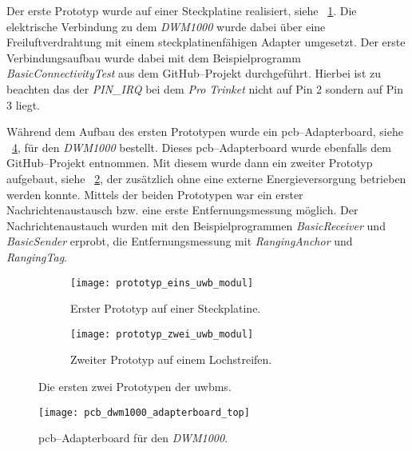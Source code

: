 Der erste Prototyp wurde auf einer Steckplatine realisiert, siehe \figurename~\ref{fig:prototyp_eins_uwb_modul}. Die elektrische Verbindung zu dem \textit{DWM1000} wurde dabei über eine Freiluftverdrahtung mit einem steckplatinenfähigen Adapter umgesetzt. Der erste Verbindungsaufbau wurde dabei mit dem Beispielprogramm \textit{BasicConnectivityTest} aus dem GitHub--Projekt \cite{Trojer2015} durchgeführt. Hierbei ist zu beachten das der \textit{PIN\_IRQ} bei dem \textit{Pro Trinket} nicht auf Pin 2 sondern auf Pin 3 liegt.

Während dem Aufbau des ersten Prototypen wurde ein \Gls{pcb}--Adapterboard, siehe \figurename~\ref{fig:pcb_dwm1000_adapterboard_top}, für den \textit{DWM1000} bestellt. Dieses \gls{pcb}--Adapterboard wurde ebenfalls dem GitHub--Projekt \cite{Trojer2015} entnommen. Mit diesem wurde dann ein zweiter Prototyp aufgebaut, siehe \figurename~\ref{fig:prototyp_zwei_uwb_modul}, der zusätzlich ohne eine externe Energieversorgung betrieben werden konnte. Mittels der beiden Prototypen war ein erster Nachrichtenaustausch bzw. eine erste Entfernungsmessung möglich. Der Nachrichtenaustauch wurden mit den Beispielprogrammen \textit{BasicReceiver} und \textit{BasicSender} erprobt, die Entfernungsmessung mit \textit{RangingAnchor} und \textit{RangingTag}.

\begin{figure}
	\begin{subfigure}[t]{0.4\textwidth}
		\texttt{[image: prototyp\_eins\_uwb\_modul]}
		\caption{Erster Prototyp auf einer Steckplatine.}
		\label{fig:prototyp_eins_uwb_modul}
	\end{subfigure}
	\hfill
	\begin{subfigure}[t]{0.4\textwidth}
		\texttt{[image: prototyp\_zwei\_uwb\_modul]}
		\caption{Zweiter Prototyp auf einem Lochstreifen.}
		\label{fig:prototyp_zwei_uwb_modul}
	\end{subfigure}
	\caption{Die ersten zwei Prototypen der \glspl{uwbm}.}
	\label{fig:prototypen_der_uwb_module}
\end{figure}

\begin{figure}
  \centering
  \texttt{[image: pcb\_dwm1000\_adapterboard\_top]}
  \caption{\Gls{pcb}--Adapterboard für den \textit{DWM1000}.}
  \label{fig:pcb_dwm1000_adapterboard_top}
\end{figure}


